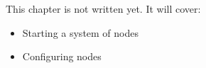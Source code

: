 \label{ch:ros2}
\begin{keyidea}
This chapter is not written yet. It will cover:
\begin{itemize}[nosep]
  \item Starting a system of nodes
  \item Configuring nodes
\end{itemize}
\end{keyidea}
